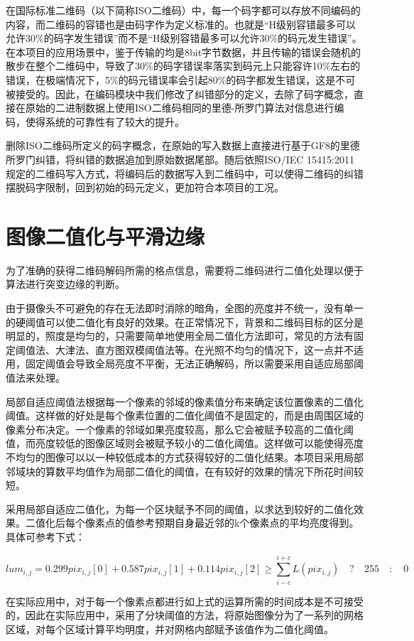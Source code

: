 在国际标准二维码（以下简称ISO二维码）中，每一个码字都可以存放不同编码的内容，而二维码的容错也是由码字作为定义标准的。也就是“H级别容错最多可以允许30\%的码字发生错误”而不是“H级别容错最多可以允许30\%的码元发生错误”。在本项目的应用场景中，鉴于传输的均是8bit字节数据，并且传输的错误会随机的散步在整个二维码中，导致了30\%的码字错误率落实到码元上只能容许10\%左右的错误，在极端情况下，5\%的码元错误率会引起80\%的码字都发生错误，这是不可被接受的。因此，在编码模块中我们修改了纠错部分的定义，去除了码字概念，直接在原始的二进制数据上使用ISO二维码相同的里德-所罗门算法对信息进行编码，使得系统的可靠性有了较大的提升。

删除ISO二维码所定义的码字概念，在原始的写入数据上直接进行基于GF8的里德所罗门纠错，将纠错的数据追加到原始数据尾部。随后依照ISO/IEC 15415:2011规定的二维码写入方式，将编码后的数据写入到二维码中，可以使得二维码的纠错摆脱码字限制，回到初始的码元定义，更加符合本项目的工况。

\section{图像二值化与平滑边缘}

为了准确的获得二维码解码所需的格点信息，需要将二维码进行二值化处理以便于算法进行突变边缘的判断。

由于摄像头不可避免的存在无法即时消除的暗角，全图的亮度并不统一，没有单一的硬阈值可以使二值化有良好的效果。在正常情况下，背景和二维码目标的区分是明显的，照度是均匀的，只需要简单地使用全局二值化方法即可，常见的方法有固定阈值法、大津法、直方图双模阈值法等。在光照不均匀的情况下，这一点并不适用，固定阈值会导致全局亮度不平衡，无法正确解码，所以需要采用自适应局部阈值法来处理。

局部自适应阈值法根据每一个像素的邻域的像素值分布来确定该位置像素的二值化阈值。这样做的好处是每个像素位置的二值化阈值不是固定的，而是由周围区域的像素分布决定。一个像素的邻域如果亮度较高，那么它会被赋予较高的二值化阈值，而亮度较低的图像区域则会被赋予较小的二值化阈值。这样做可以能使得亮度不均匀的图像可以以一种较低成本的方式获得较好的二值化结果。本项目采用局部邻域块的算数平均值作为局部二值化的阈值，在有较好的效果的情况下所花时间较短。

采用局部自适应二值化，为每一个区块赋予不同的阈值，以求达到较好的二值化效果。二值化后每个像素点的值参考预期自身最近邻的k个像素点的平均亮度得到。具体可参考下式：

$$
lum_{i,j}=0.299pix_{i,j}[0]+0.587pix_{i,j}[1]+0.114pix_{i,j}[2] \geq \sum_{i-c}^{i+c}L(pix_{i,j})\quad?\quad 255\quad : \quad 0
$$

在实际应用中，对于每一个像素点都进行如上式的运算所需的时间成本是不可接受的，因此在实际应用中，采用了分块阈值的方法，将原始图像分为了一系列的网格区域，对每个区域计算平均明度，并对网格内部赋予该值作为二值化阈值。

